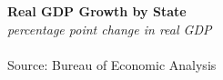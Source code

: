 \documentclass{report}
\begin{document}
\noindent \normalsize \textbf{Real GDP Growth by State}\\
\footnotesize{\textit{percentage point change in real GDP}}\\
\vspace{-2mm}
\hspace{-8mm}  \\
\footnotesize{Source: Bureau of Economic Analysis}\\

\vspace{2mm}

\begin{minipage}{0.76\textwidth}

\small  
\end{minipage}

\vspace{2mm}
\end{document}
